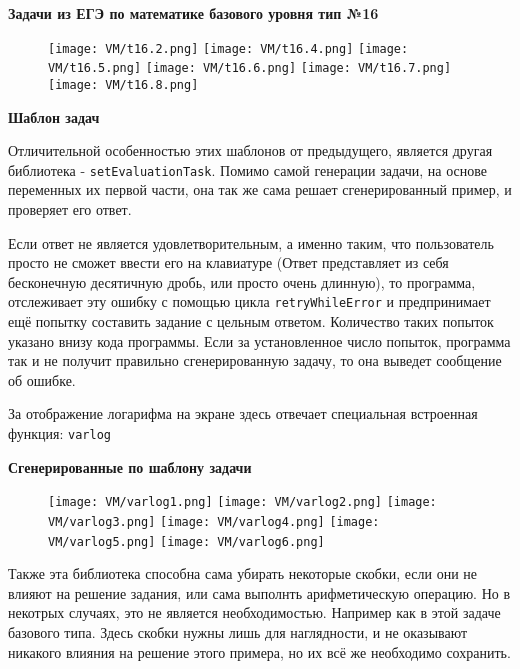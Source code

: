 \textbf{Задачи из ЕГЭ по математике базового уровня тип №16}

	\begin{figure}[h]
		\centering
		\texttt{[image: VM/t16.2.png]}
		\texttt{[image: VM/t16.4.png]}
		\texttt{[image: VM/t16.5.png]}
		\texttt{[image: VM/t16.6.png]}
		\texttt{[image: VM/t16.7.png]}
		\texttt{[image: VM/t16.8.png]}
\end{figure}
	
\textbf{Шаблон задач}


	
Отличительной особенностью этих шаблонов от предыдущего, является другая библиотека - \texttt{setEvaluationTask}. Помимо самой генерации задачи, на основе переменных их первой части, она так же сама решает сгенерированный пример, и проверяет его ответ. 

Если ответ не является удовлетворительным, а именно таким, что пользователь просто не сможет ввести его на клавиатуре (Ответ представляет из себя бесконечную десятичную дробь, или просто очень длинную), то программа, отслеживает эту ошибку с помощью цикла \texttt{retryWhileError} и предпринимает ещё попытку составить задание с цельным ответом. Количество таких попыток указано внизу кода программы. Если за установленное число попыток, программа так и не получит правильно сгенерированную задачу, то она выведет сообщение об ошибке.

За отображение логарифма на экране здесь отвечает специальная встроенная функция: \texttt{varlog}

\textbf{Сгенерированные по шаблону задачи}

\begin{figure}[h]
		\centering
		\texttt{[image: VM/varlog1.png]}
		\texttt{[image: VM/varlog2.png]}
		\texttt{[image: VM/varlog3.png]}
		\texttt{[image: VM/varlog4.png]}
		\texttt{[image: VM/varlog5.png]}
		\texttt{[image: VM/varlog6.png]}
\end{figure}

Также эта библиотека способна сама убирать некоторые скобки, если они не влияют на решение задания, или сама выполнть арифметическую операцию. Но в некотрых случаях, это не является необходимостью. Например как в этой задаче базового типа. Здесь скобки нужны лишь для наглядности, и не оказывают никакого влияния на решение этого примера, но их всё же необходимо сохранить.

